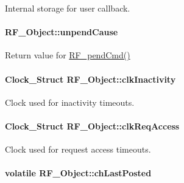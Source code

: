 Internal storage for user callback. 

\paragraph[{unpend\+Cause}]{ R\+F\+\_\+\+Object\+::unpend\+Cause}\label{struct_r_f___object_a41528750208c1e201b276509396e0a30}


Return value for \hyperlink{_r_f_8h_a91c1cb2508311f822acbc08ace568a83}{R\+F\+\_\+pend\+Cmd()} 

\paragraph[{clk\+Inactivity}]{\setlength{\rightskip}{0pt plus 5cm}Clock\+\_\+\+Struct R\+F\+\_\+\+Object\+::clk\+Inactivity}\label{struct_r_f___object_aaa9b100fc07809bd9086ffc44ebd4225}


Clock used for inactivity timeouts. 

\paragraph[{clk\+Req\+Access}]{\setlength{\rightskip}{0pt plus 5cm}Clock\+\_\+\+Struct R\+F\+\_\+\+Object\+::clk\+Req\+Access}\label{struct_r_f___object_af61760e322c9a76d591bb8b465c9ed37}


Clock used for request access timeouts. 

\paragraph[{ch\+Last\+Posted}]{ volatile R\+F\+\_\+\+Object\+::ch\+Last\+Posted}\label{struct_r_f___object_a855d6435f6532e99b2e6d6e1675212ca}


